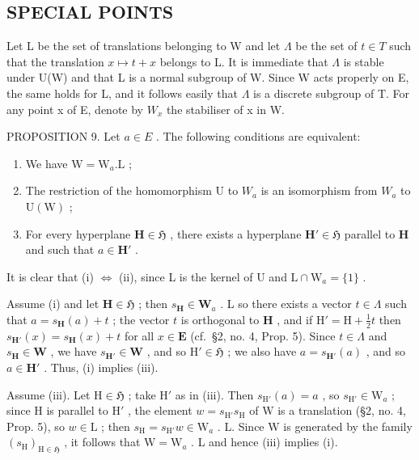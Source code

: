 \subsection{SPECIAL POINTS}

Let L be the set of translations belonging to W and let \(\Lambda\) be the set of \(t \in T\) such that the translation \(x \mapsto t + x\) belongs to L. It is immediate that \(\Lambda\) is stable under U(W) and that L is a normal subgroup of W. Since W acts properly on E, the same holds for L, and it follows easily that \(\Lambda\) is a discrete subgroup of T. For any point x of E, denote by \(W_x\) the stabiliser of x in W.

PROPOSITION 9. Let \(a \in E\) . The following conditions are equivalent:

\begin{enumerate}
\def\labelenumi{(\roman{enumi})}
\item
  We have \(\mathrm{W} = \mathrm{W}_{a}.\mathrm{L}\) ;
\item
  The restriction of the homomorphism U to \(W_{a}\) is an isomorphism from \(W_{a}\) to \(\mathrm{U}(\mathrm{W})\) ;
\item
  For every hyperplane \(\mathbf{H} \in \mathfrak{H}\) , there exists a hyperplane \(\mathbf{H}' \in \mathfrak{H}\) parallel to \(\mathbf{H}\) and such that \(a \in \mathbf{H}'\) .
\end{enumerate}

It is clear that (i) \(\Leftrightarrow\) (ii), since L is the kernel of U and \(\mathrm{L} \cap \mathrm{W}_a = \{1\}\) .

Assume (i) and let \(\mathbf{H} \in \mathfrak{H}\) ; then \(s_{\mathbf{H}} \in \mathbf{W}_a\) . L so there exists a vector \(t \in \Lambda\) such that \(a = s_{\mathbf{H}}(a) + t\) ; the vector \(t\) is orthogonal to \(\mathbf{H}\) , and if \(\mathrm{H}' = \mathrm{H} + \frac{1}{2} t\) then \(s_{\mathbf{H}'}(x) = s_{\mathbf{H}}(x) + t\) for all \(x \in \mathbf{E}\) (cf.~§2, no. 4, Prop. 5). Since \(t \in \Lambda\) and \(s_{\mathbf{H}} \in \mathbf{W}\) , we have \(s_{\mathbf{H}'} \in \mathbf{W}\) , and so \(\mathrm{H}' \in \mathfrak{H}\) ; we also have \(a = s_{\mathbf{H}'}(a)\) , and so \(a \in \mathbf{H}'\) . Thus, (i) implies (iii).

Assume (iii). Let \(\mathrm{H} \in \mathfrak{H}\) ; take \(\mathrm{H}'\) as in (iii). Then \(s_{\mathrm{H}'}(a) = a\) , so \(s_{\mathrm{H}'} \in \mathrm{W}_a\) ; since \(\mathrm{H}\) is parallel to \(\mathrm{H}'\) , the element \(w = s_{\mathrm{H}'} s_{\mathrm{H}}\) of \(\mathrm{W}\) is a translation (§2, no. 4, Prop. 5), so \(w \in \mathrm{L}\) ; then \(s_{\mathrm{H}} = s_{\mathrm{H}'} w \in \mathrm{W}_a\) . L. Since \(\mathrm{W}\) is generated by the family \((s_{\mathrm{H}})_{\mathrm{H} \in \mathfrak{H}}\) , it follows that \(\mathrm{W} = \mathrm{W}_a\) . L and hence (iii) implies (i).

